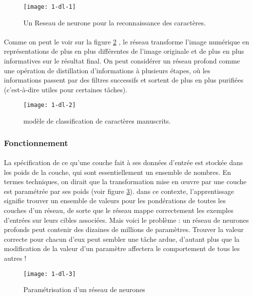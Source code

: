 \begin{figure}[h]
    \centering
    \texttt{[image: 1-dl-1]}
    \caption{Un Reseau de neurone pour la reconnaissance des caractères.}
    \label{fig:1-dl-1}
\end{figure}

\paragraph{}Comme on peut le voir sur la figure \ref{fig:1-dl-2} , le réseau transforme l'image numérique en représentations de plus en plus différentes de l'image originale et de plus en plus informatives sur le résultat final. On peut  considérer un réseau profond comme une opération de distillation d'informations à plusieurs étapes, où les informations passent par des filtres successifs et sortent de plus en plus purifiées (c'est-à-dire utiles pour certaines tâches).

\begin{figure}[h]
    \centering
    \texttt{[image: 1-dl-2]}
    \caption{modèle de classification de caractères manuscrits.}
    \label{fig:1-dl-2}
\end{figure}
\paragraph{}

\subsubsection{Fonctionnement}
\paragraph{}La spécification de ce qu'une couche fait à ses données d'entrée est stockée dans les poids de la couche, qui sont essentiellement un ensemble de nombres. En termes techniques, on dirait que la transformation mise en œuvre par une couche est paramétrée par ses poids (voir figure \ref{fig:1-dl-3}). dans  ce contexte, l'apprentissage signifie trouver un ensemble de valeurs pour les pondérations de toutes les couches d'un réseau, de sorte que le réseau mappe correctement les exemples d'entrées sur leurs cibles associées.
Mais voici le problème : un réseau de neurones profonds peut contenir des dizaines de millions de paramètres. Trouver la valeur correcte pour chacun d'eux peut sembler une tâche ardue, d'autant plus que la modification de la valeur d'un paramètre affectera le comportement de tous les autres !
\begin{figure}[h]
    \centering
    \texttt{[image: 1-dl-3]}
    \caption{Paramétrisation d’un réseau de neurones}
    \label{fig:1-dl-3}
\end{figure}

